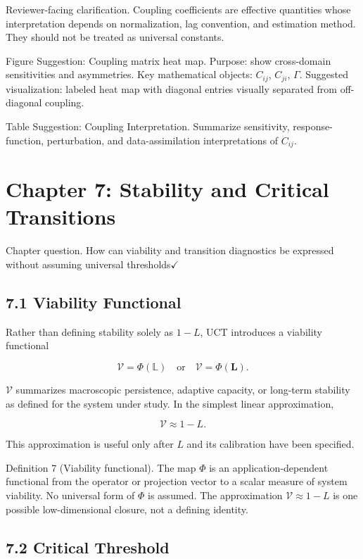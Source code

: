 \documentclass[aps,pre,reprint,superscriptaddress,nofootinbib]{revtex4-2}
\begin{document}
Reviewer-facing clarification. Coupling coefficients are effective quantities whose interpretation depends on normalization, lag convention, and estimation method. They should not be treated as universal constants.

Figure Suggestion: Coupling matrix heat map. Purpose: show cross-domain sensitivities and asymmetries. Key mathematical objects: \(C_{ij}\), \(C_{ji}\), \(\Gamma\). Suggested visualization: labeled heat map with diagonal entries visually separated from off-diagonal coupling.

Table Suggestion: Coupling Interpretation. Summarize sensitivity, response-function, perturbation, and data-assimilation interpretations of \(C_{ij}\).

\section{Chapter 7: Stability and Critical Transitions}

Chapter question. How can viability and transition diagnostics be expressed without assuming universal thresholds$\checkmark$

\subsection{7.1 Viability Functional}

Rather than defining stability solely as \(1-L\), UCT introduces a viability functional

\[ \mathcal{V}=\Phi(\mathbb{L}) \quad \text{or} \quad \mathcal{V}=\Phi(\mathbf{L}). \]

\(\mathcal{V}\) summarizes macroscopic persistence, adaptive capacity, or long-term stability as defined for the system under study. In the simplest linear approximation,

\[ \mathcal{V}\approx 1-L. \]

This approximation is useful only after \(L\) and its calibration have been specified.

Definition 7 (Viability functional). The map \(\Phi\) is an application-dependent functional from the operator or projection vector to a scalar measure of system viability. No universal form of \(\Phi\) is assumed. The approximation \(\mathcal{V}\approx 1-L\) is one possible low-dimensional closure, not a defining identity.

\subsection{7.2 Critical Threshold}
\end{document}
